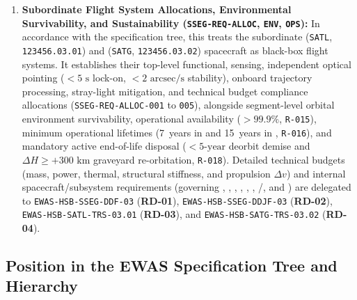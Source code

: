 \begin{enumerate}
    \item \textbf{Subordinate Flight System Allocations, Environmental Survivability, and Sustainability (\texttt{SSEG-REQ-ALLOC}, \texttt{ENV}, \texttt{OPS}):} In accordance with the  specification tree, this  treats the subordinate  (\texttt{SATL},  \texttt{123456.03.01}) and  (\texttt{SATG},  \texttt{123456.03.02}) spacecraft as black-box flight systems. It establishes their top-level functional, sensing, independent optical  pointing ($< 5\text{ s}$ lock-on, $< 2\text{ arcsec/s}$ stability), onboard trajectory processing, stray-light mitigation, and technical budget compliance allocations (\texttt{SSEG-REQ-ALLOC-001} to \texttt{005}), alongside segment-level orbital environment survivability, operational availability ($> 99.9\%$, \texttt{R-015}), minimum operational lifetimes (7~years in  and 15~years in , \texttt{R-016}), and mandatory active end-of-life disposal ($< 5\text{-year}$  deorbit demise and $\Delta H \ge +300\text{ km}$  graveyard re-orbitation, \texttt{R-018}). Detailed technical budgets (mass, power, thermal, structural stiffness, and propulsion $\Delta v$) and internal spacecraft/subsystem requirements (governing , , , , , , /, and ) are delegated to \texttt{EWAS-HSB-SSEG-DDF-03} (\textbf{RD-01}), \texttt{EWAS-HSB-SSEG-DDJF-03} (\textbf{RD-02}), \texttt{EWAS-HSB-SATL-TRS-03.01} (\textbf{RD-03}), and \texttt{EWAS-HSB-SATG-TRS-03.02} (\textbf{RD-04}).
\end{enumerate}

\subsection{Position in the EWAS Specification Tree and Hierarchy}

